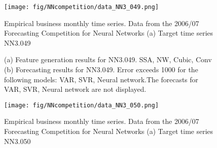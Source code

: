 \documentclass[12pt]{article}
\begin{document}
\begin{figure}
\centering
\texttt{[image: fig/NNcompetition/data\_NN3\_049.png]}
\caption{Empirical business monthly time series. Data from the 2006/07 Forecasting Competition for Neural Networks	(a) Target time series	NN3.049	}
\end{figure}


\begin{figure}
\centering
{}
\caption{(a)	Feature generation results for	NN3.049.	SSA, NW, Cubic, Conv	(b)	Forecasting results for	NN3.049.		Error exceeds 1000 for the following models: VAR, SVR, Neural network.The forecasts for VAR, SVR, Neural network are not displayed.	}
\end{figure}


\begin{figure}
\centering
\texttt{[image: fig/NNcompetition/data\_NN3\_050.png]}
\caption{Empirical business monthly time series. Data from the 2006/07 Forecasting Competition for Neural Networks	(a) Target time series	NN3.050	}
\end{figure}
\end{document}
